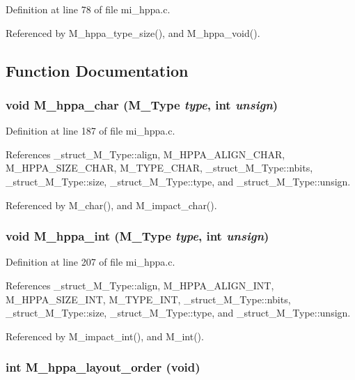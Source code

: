 Definition at line 78 of file mi\_\-hppa.c.

Referenced by M\_\-hppa\_\-type\_\-size(), and M\_\-hppa\_\-void().

\subsection{Function Documentation}
\subsubsection{\setlength{\rightskip}{0pt plus 5cm}void M\_\-hppa\_\-char (\bf{M\_\-Type} {\em type}, int {\em unsign})}\label{mi__hppa_8c_149b79ce3c8138691314a008f11b0e01}




Definition at line 187 of file mi\_\-hppa.c.

References \_\-struct\_\-M\_\-Type::align, M\_\-HPPA\_\-ALIGN\_\-CHAR, M\_\-HPPA\_\-SIZE\_\-CHAR, M\_\-TYPE\_\-CHAR, \_\-struct\_\-M\_\-Type::nbits, \_\-struct\_\-M\_\-Type::size, \_\-struct\_\-M\_\-Type::type, and \_\-struct\_\-M\_\-Type::unsign.

Referenced by M\_\-char(), and M\_\-impact\_\-char().
\subsubsection{\setlength{\rightskip}{0pt plus 5cm}void M\_\-hppa\_\-int (\bf{M\_\-Type} {\em type}, int {\em unsign})}\label{mi__hppa_8c_cf3c52d4ccc36af063ed710e8cd30621}




Definition at line 207 of file mi\_\-hppa.c.

References \_\-struct\_\-M\_\-Type::align, M\_\-HPPA\_\-ALIGN\_\-INT, M\_\-HPPA\_\-SIZE\_\-INT, M\_\-TYPE\_\-INT, \_\-struct\_\-M\_\-Type::nbits, \_\-struct\_\-M\_\-Type::size, \_\-struct\_\-M\_\-Type::type, and \_\-struct\_\-M\_\-Type::unsign.

Referenced by M\_\-impact\_\-int(), and M\_\-int().
\subsubsection{\setlength{\rightskip}{0pt plus 5cm}int M\_\-hppa\_\-layout\_\-order (void)}\label{mi__hppa_8c_49c051dc867ed902e61dfc1094b7de25}




